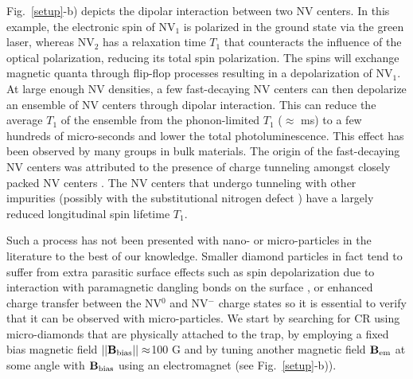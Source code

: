 \documentclass[preprintnumbers,amsmath,amssymb,superscriptaddress,twocolumn,showpacs]{revtex4-1}
\begin{document}
Fig.~\ref{setup}-b) depicts the dipolar interaction between two NV centers. In this example, the electronic spin of NV$_1$ is polarized in the ground state via the green laser, whereas NV$_2$ has a relaxation time $T_1$ that counteracts the influence of the optical polarization, reducing its total spin polarization. The spins will exchange magnetic quanta through flip-flop processes resulting in a depolarization of NV$_1$. At large enough NV densities, a few fast-decaying NV centers can then depolarize an ensemble of NV centers through dipolar interaction. This can reduce the average $T_1$ of the ensemble from the phonon-limited $T_1$ ($\approx$ ms) to a few hundreds of micro-seconds \cite{Jarmola} and lower the total photoluminescence. 
This effect has been observed by many groups \cite{van_oort_cross-relaxation_1989, armstrong_nvnv_2010, jarmola_longitudinal_2015, akhmedzhanov_microwave-free_2017, akhmedzhanov_magnetometry_2019, holliday_optical_1989, mrozek_longitudinal_2015, choi_depolarization_2017} in bulk materials. The origin of the fast-decaying NV centers was attributed to the presence of charge tunneling amongst closely packed NV centers \cite{choi_depolarization_2017}. The NV centers that undergo tunneling with other impurities (possibly with the substitutional nitrogen defect \cite{manson_nv_2018}) have a largely reduced longitudinal spin lifetime $T_1$.

Such a process has not been presented with nano- or micro-particles in the literature to the best of our knowledge. Smaller diamond particles in fact tend to suffer from extra parasitic surface effects such as spin depolarization due to interaction with paramagnetic dangling bonds on the surface \cite{Tetienne}, or enhanced charge transfer between the NV$^0$ and NV$^-$ charge states \cite{Dhomkar} so it is essential to verify that it can be observed with micro-particles. 
We start by searching for CR using micro-diamonds that are physically attached to the trap, by employing a fixed bias magnetic field $||\bf B_{\rm bias}||\approx$100 G and by tuning another magnetic field $\bf B_{\rm em}$ at some angle with $\bf B_{\rm bias}$ using an electromagnet (see Fig.~\ref{setup}-b)). 
\end{document}
